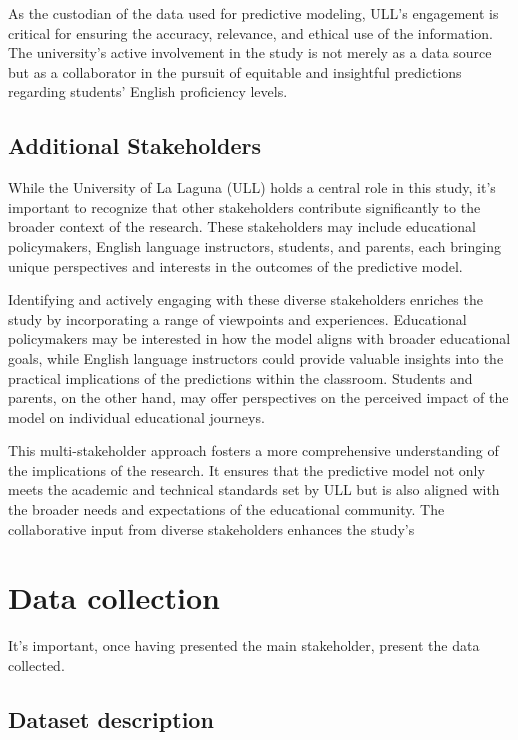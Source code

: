 \documentclass[12pt,a4paper,openright,twoside]{book}
\begin{document}
As the custodian of the data used for predictive modeling, ULL's engagement is critical for ensuring the accuracy, relevance, and ethical use of the information. The university's active involvement in the study is not merely as a data source but as a collaborator in the pursuit of equitable and insightful predictions regarding students' English proficiency levels.

\subsection{Additional Stakeholders}

While the University of La Laguna (ULL) holds a central role in this study, it's important to recognize that other stakeholders contribute significantly to the broader context of the research. These stakeholders may include educational policymakers, English language instructors, students, and parents, each bringing unique perspectives and interests in the outcomes of the predictive model.

Identifying and actively engaging with these diverse stakeholders enriches the study by incorporating a range of viewpoints and experiences. Educational policymakers may be interested in how the model aligns with broader educational goals, while English language instructors could provide valuable insights into the practical implications of the predictions within the classroom. Students and parents, on the other hand, may offer perspectives on the perceived impact of the model on individual educational journeys.

This multi-stakeholder approach fosters a more comprehensive understanding of the implications of the research. It ensures that the predictive model not only meets the academic and technical standards set by ULL but is also aligned with the broader needs and expectations of the educational community. The collaborative input from diverse stakeholders enhances the study's 

\section{Data collection}

It's important, once having presented the main stakeholder, present the data collected.

\subsection{Dataset description}
\end{document}
